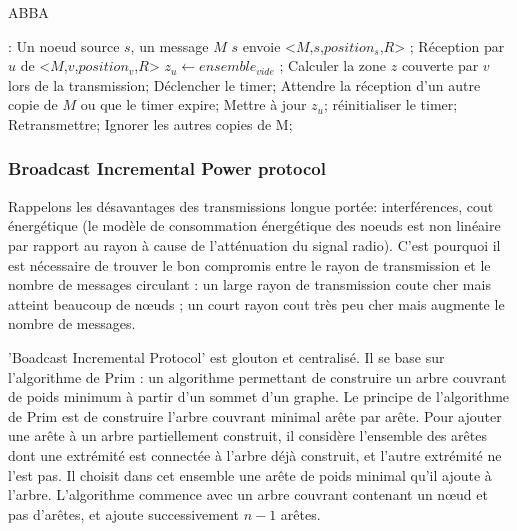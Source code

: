\begin{algorithm}[h]
\caption{ABBA}
\label{ABBA}
\begin{algorithmic}
\REQUIRE:
Un noeud source $s$, un message $M$
\STATE $s$ envoie  <$M$,$s$,$position_s$,$R$> ;
\STATE Réception  par  $u$ de  <$M$,$v$,$position_v$,$R$>
\STATE $z_u\leftarrow ensemble_{vide}$ ;
\STATE Calculer la zone $z$ couverte par $v$ lors de la transmission;
\STATE Déclencher le timer;
\REPEAT
    \STATE Attendre la réception d'un autre copie de $M$ ou que le timer expire;
	\STATE Mettre à jour $z_u$;
	\STATE réinitialiser le timer;
    \ENDIF
{}
    \STATE Retransmettre;
\ENDIF
     \STATE Ignorer les autres copies de M;

\end{algorithmic}
\end{algorithm}




\subsubsection{Broadcast Incremental Power protocol \cite{Wieselthier2000}}

  Rappelons les désavantages des transmissions longue portée: interférences, cout énergétique (le modèle de consommation énergétique des noeuds est non linéaire par rapport au rayon à cause de l'atténuation du signal radio).
C'est pourquoi il est nécessaire de trouver le bon compromis entre le rayon de transmission et le nombre de messages circulant : un large rayon de transmission coute cher mais atteint beaucoup de nœuds ; un court rayon cout très peu cher mais augmente le nombre de messages. 

'Boadcast Incremental Protocol' est glouton et centralisé. Il se base sur l'algorithme de Prim \cite{Prim1957} : un algorithme permettant de construire un arbre couvrant de poids minimum à partir d'un sommet d'un graphe. Le principe de l'algorithme de Prim est de construire l'arbre couvrant minimal arête par arête. Pour ajouter une arête à un arbre partiellement construit, il considère l'ensemble des arêtes dont une extrémité est connectée à l'arbre déjà construit, et l'autre extrémité ne l'est pas. Il choisit dans cet ensemble une arête de poids minimal qu'il ajoute à l'arbre. L'algorithme commence avec un arbre couvrant contenant un nœud et pas d'arêtes, et ajoute successivement $n-1$ arêtes.

